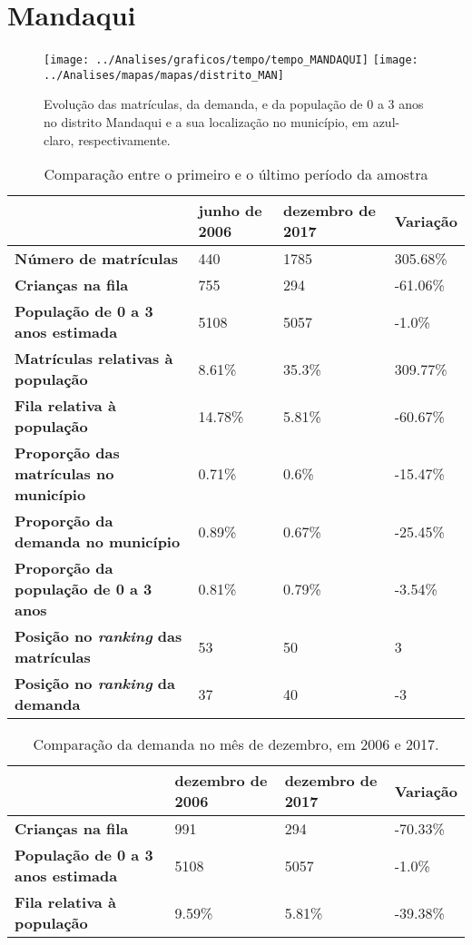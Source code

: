 \section{Mandaqui}
\begin{figure}[H]
\centering
\texttt{[image: ../Analises/graficos/tempo/tempo\_MANDAQUI]}
\texttt{[image: ../Analises/mapas/mapas/distrito\_MAN]}
\caption{Evolução das matrículas, da demanda, e da população de 0 a 3 anos no distrito Mandaqui e a sua localização no município, em azul-claro, respectivamente.}
\end{figure}
\begin{table}[H]
\begin{tabular}{l|l|l|l}
\textbf{}                                      & \textbf{junho de 2006}       & \textbf{dezembro de 2017}    & \textbf{Variação} \\ \hline
\textbf{Número de matrículas}                  & 440 & 1785 & 305.68\% \\ \hline
\textbf{Crianças na fila}                      & 755 & 294 & -61.06\% \\ \hline
\textbf{População de 0 a 3 anos estimada}      & 5108 & 5057 & -1.0\% \\ \hline
\textbf{Matrículas relativas à população}      & 8.61\% & 35.3\% & 309.77\% \\ \hline
\textbf{Fila relativa à população}             & 14.78\% & 5.81\% & -60.67\% \\ \hline
\textbf{Proporção das matrículas no município} & 0.71\% & 0.6\% & -15.47\% \\ \hline
\textbf{Proporção da demanda no município}     & 0.89\% & 0.67\% & -25.45\% \\ \hline
\textbf{Proporção da população de 0 a 3 anos}  & 0.81\% & 0.79\% & -3.54\% \\ \hline
\textbf{Posição no \textit{ranking} das matrículas}     & 53 & 50 & 3 \\ \hline
\textbf{Posição no \textit{ranking} da demanda}         & 37 & 40 & -3 \\ 
\end{tabular}
\caption{Comparação entre o primeiro e o último período da amostra}
\end{table}
\begin{table}[H]
\begin{tabular}{l|l|l|l}
\textbf{}                                 & \textbf{dezembro de 2006} & \textbf{dezembro de 2017} & \textbf{Variação} \\ \hline
\textbf{Crianças na fila}                      & 991 & 294 & -70.33\% \\ \hline
\textbf{População de 0 a 3 anos estimada}      & 5108 & 5057 & -1.0\% \\ \hline
\textbf{Fila relativa à população}             & 9.59\% & 5.81\% & -39.38\% \\
\end{tabular}
\caption{Comparação da demanda no mês de dezembro, em 2006 e 2017.}
\end{table}
